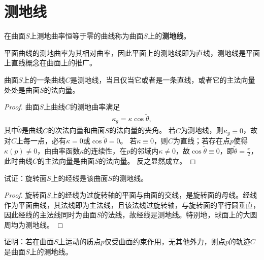 \documentclass[../../main.tex]{subfiles}%
\begin{document}
\section{测地线}

\begin{definition}
在曲面$S$上测地曲率恒等于零的曲线称为曲面$S$上的\textbf{测地线}。
\end{definition}

\begin{remark}
平面曲线的测地曲率为其相对曲率，因此平面上的测地线即为直线，测地线是平面上直线概念在曲面上的推广。
\end{remark}

\begin{theorem}
曲面$S$上的一条曲线$C$是测地线，当且仅当它或者是一条直线，或者它的主法向量处处是曲面$S$的法向量。
\end{theorem}

\begin{proof}
曲面$S$上曲线$C$的测地曲率满足
\begin{align}
\kappa_g = \kappa \cos\tilde{\theta},
\end{align}
其中$\tilde{\theta}$是曲线$C$的次法向量和曲面$S$的法向量的夹角。
若$C$为测地线，则$\kappa_g \equiv 0$，故对$C$上每一点，必有$\kappa=0$或$\cos\tilde{\theta}=0$。
若$\kappa \equiv 0$，则$C$为直线；若存在点$p$使得$\kappa(p)\neq0$，由曲率函数$\kappa$的连续性，在$p$的邻域内$\kappa\neq0$，故$\cos\tilde{\theta}\equiv0$，即$\tilde{\theta}=\frac{\pi}{2}$，此时曲线$C$的主法向量是曲面$S$的法向量。
反之显然成立。
\end{proof}

\begin{example}
试证：旋转面$S$上的经线是该曲面$S$的测地线。
\end{example}

\begin{proof}
旋转面$S$上的经线为过旋转轴的平面与曲面的交线，是旋转面的母线。经线作为平面曲线，其法线即为主法线，且该法线过旋转轴，与旋转面的平行圆垂直，因此经线的主法线同时为曲面$S$的法线，故经线是测地线。特别地，球面上的大圆周均为测地线。
\end{proof}

\begin{example}
证明：若在曲面$S$上运动的质点$p$仅受曲面约束作用，无其他外力，则点$p$的轨迹$C$是曲面$S$上的测地线。
\end{example}
\end{document}
